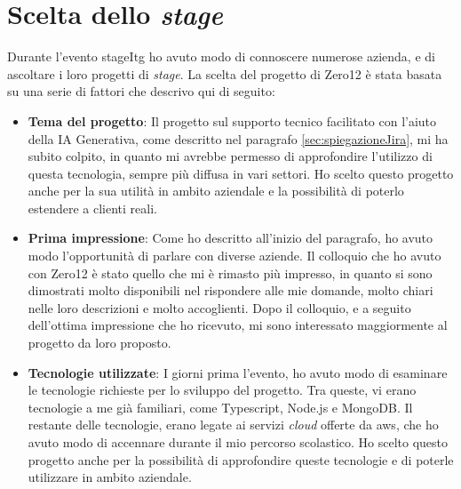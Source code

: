 \section{Scelta dello \textit{stage}} \label{sec:sceltaStage}
Durante l'evento \gls{stageItg} ho avuto modo di connoscere numerose azienda, e di ascoltare i loro progetti di \textit{stage}. 
La scelta del progetto di Zero12 è stata basata su una serie di fattori che descrivo qui di seguito:
\begin{itemize}
    \item \textbf{Tema del progetto}: Il progetto sul supporto tecnico facilitato con l'aiuto della IA Generativa, come descritto nel paragrafo \ref{sec:spiegazioneJira}, mi ha subito colpito, in quanto mi avrebbe permesso di approfondire l'utilizzo di questa tecnologia, sempre più diffusa in vari settori. Ho scelto questo progetto anche per la sua utilità in ambito aziendale e la possibilità di poterlo estendere a clienti reali.
    \item \textbf{Prima impressione}: Come ho descritto all'inizio del paragrafo, ho avuto modo l'opportunità di parlare con diverse aziende. Il colloquio che ho avuto con Zero12 è stato quello che mi è rimasto più impresso, in quanto si sono dimostrati molto disponibili nel rispondere alle mie domande, molto chiari nelle loro descrizioni e molto accoglienti. Dopo il colloquio, e a seguito dell'ottima impressione che ho ricevuto, mi sono interessato maggiormente al progetto da loro proposto.
    \item \textbf{Tecnologie utilizzate}: I giorni prima l'evento, ho avuto modo di esaminare le tecnologie richieste per lo sviluppo del progetto. Tra queste, vi erano tecnologie a me già familiari, come Typescript, Node.js e MongoDB. Il restante delle tecnologie, erano legate ai servizi \textit{cloud} offerte da \gls{aws}, che ho avuto modo di accennare durante il mio percorso scolastico. Ho scelto questo progetto anche per la possibilità di approfondire queste tecnologie e di poterle utilizzare in ambito aziendale.
\end{itemize}


